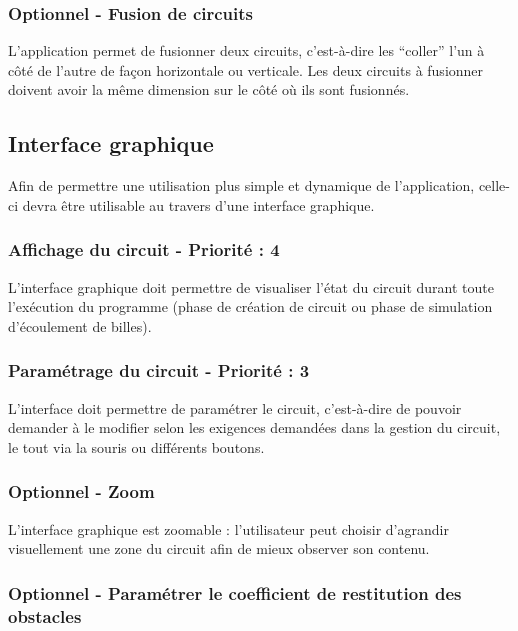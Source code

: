 \documentclass{report}
\begin{document}
\subsubsection{Optionnel - Fusion de circuits}

L’application permet de fusionner deux circuits, c’est-à-dire les “coller” l’un à côté de l’autre de façon horizontale ou verticale. Les deux circuits à fusionner doivent avoir la même dimension sur le côté où ils sont fusionnés.

\subsection{Interface graphique}

Afin de permettre une utilisation plus simple et dynamique de l’application, celle-ci devra être utilisable au travers d’une interface graphique.

\subsubsection{Affichage du circuit - Priorité : 4}

L’interface graphique doit permettre de visualiser l’état du circuit durant toute l’exécution du programme (phase de création de circuit ou phase de simulation d’écoulement de billes).

\subsubsection{Paramétrage du circuit - Priorité : 3}

L’interface doit permettre de paramétrer le circuit, c’est-à-dire de pouvoir demander à le modifier selon les exigences demandées dans la gestion du circuit, le tout via la souris ou différents boutons.

\subsubsection{Optionnel - Zoom}

L’interface graphique est zoomable : l’utilisateur peut choisir d’agrandir visuellement une zone du circuit afin de mieux observer son contenu.

\subsubsection{Optionnel - Paramétrer le coefficient de restitution des obstacles}
\end{document}
